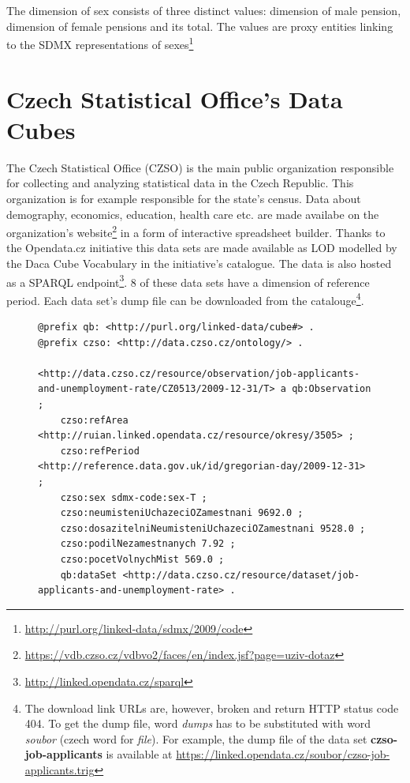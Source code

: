 The dimension of sex consists of three distinct values: dimension of male pension, dimension of female pensions and its total. The values are proxy entities linking to the SDMX representations of sexes\footnote{\href{http://purl.org/linked-data/sdmx/2009/code}{http://purl.org/linked-data/sdmx/2009/code}}

\section{Czech Statistical Office's Data Cubes}

The Czech Statistical Office (CZSO) is the main public organization responsible for collecting and analyzing statistical data in the Czech Republic. This organization is for example responsible for the state's census. Data about demography, economics, education, health care etc. are made availabe on the organization's website\footnote{\href{https://vdb.czso.cz/vdbvo2/faces/en/index.jsf?page=uziv-dotaz}{https://vdb.czso.cz/vdbvo2/faces/en/index.jsf?page=uziv-dotaz}} in a form of interactive spreadsheet builder. Thanks to the Opendata.cz initiative this data sets are made available as LOD modelled by the Daca Cube Vocabulary in the initiative's catalogue. The data is also hosted as a SPARQL endpoint\footnote{\href{http://linked.opendata.cz/sparql}{http://linked.opendata.cz/sparql}}. 8 of these data sets have a dimension of reference period. Each data set’s dump file can be downloaded from the catalouge\footnote{The download link URLs are, however, broken and return HTTP status code 404. To get the dump file, word \textit{dumps} has to be substituted with word \textit{soubor} (czech word for \textit{file}). For example, the dump file of the data set \textbf{czso-job-applicants} is available at \href{https://linked.opendata.cz/soubor/czso-job-applicants.trig}{https://linked.opendata.cz/soubor/czso-job-applicants.trig}}.

\begin{figure}[h]
\begin{lstlisting}[language = turtle, caption={Example of an observation from the CZSO data sets}, label={turtleexample},captionpos=b escapeinside={(*@}{@*)}]
@prefix qb: <http://purl.org/linked-data/cube#> .
@prefix czso: <http://data.czso.cz/ontology/> .

<http://data.czso.cz/resource/observation/job-applicants-and-unemployment-rate/CZ0513/2009-12-31/T> a qb:Observation ;
    czso:refArea <http://ruian.linked.opendata.cz/resource/okresy/3505> ;
    czso:refPeriod <http://reference.data.gov.uk/id/gregorian-day/2009-12-31> ;
    czso:sex sdmx-code:sex-T ;
    czso:neumisteniUchazeciOZamestnani 9692.0 ;
    czso:dosazitelniNeumisteniUchazeciOZamestnani 9528.0 ;
    czso:podilNezamestnanych 7.92 ;
    czso:pocetVolnychMist 569.0 ;
    qb:dataSet <http://data.czso.cz/resource/dataset/job-applicants-and-unemployment-rate> .
\end{lstlisting}
\end{figure}

